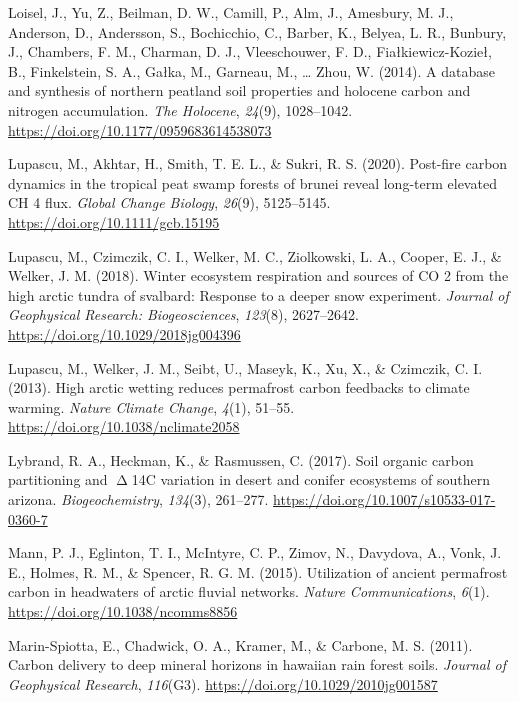 \documentclass[]{article}
\begin{document}
\leavevmode\hypertarget{ref-Loisel_2014}{}%
Loisel, J., Yu, Z., Beilman, D. W., Camill, P., Alm, J., Amesbury, M.
J., Anderson, D., Andersson, S., Bochicchio, C., Barber, K., Belyea, L.
R., Bunbury, J., Chambers, F. M., Charman, D. J., Vleeschouwer, F. D.,
Fiałkiewicz-Kozieł, B., Finkelstein, S. A., Gałka, M., Garneau, M.,
\ldots{} Zhou, W. (2014). A database and synthesis of northern peatland
soil properties and holocene carbon and nitrogen accumulation. \emph{The
Holocene}, \emph{24}(9), 1028--1042.
\url{https://doi.org/10.1177/0959683614538073}

\leavevmode\hypertarget{ref-Lupascu_2020}{}%
Lupascu, M., Akhtar, H., Smith, T. E. L., \& Sukri, R. S. (2020).
Post-fire carbon dynamics in the tropical peat swamp forests of brunei
reveal long-term elevated CH 4 flux. \emph{Global Change Biology},
\emph{26}(9), 5125--5145. \url{https://doi.org/10.1111/gcb.15195}

\leavevmode\hypertarget{ref-Lupascu_2018}{}%
Lupascu, M., Czimczik, C. I., Welker, M. C., Ziolkowski, L. A., Cooper,
E. J., \& Welker, J. M. (2018). Winter ecosystem respiration and sources
of CO 2 from the high arctic tundra of svalbard: Response to a deeper
snow experiment. \emph{Journal of Geophysical Research: Biogeosciences},
\emph{123}(8), 2627--2642. \url{https://doi.org/10.1029/2018jg004396}

\leavevmode\hypertarget{ref-Lupascu_2013}{}%
Lupascu, M., Welker, J. M., Seibt, U., Maseyk, K., Xu, X., \& Czimczik,
C. I. (2013). High arctic wetting reduces permafrost carbon feedbacks to
climate warming. \emph{Nature Climate Change}, \emph{4}(1), 51--55.
\url{https://doi.org/10.1038/nclimate2058}

\leavevmode\hypertarget{ref-Lybrand_2017}{}%
Lybrand, R. A., Heckman, K., \& Rasmussen, C. (2017). Soil organic
carbon partitioning and \(\upDelta\)14C variation in desert and conifer
ecosystems of southern arizona. \emph{Biogeochemistry}, \emph{134}(3),
261--277. \url{https://doi.org/10.1007/s10533-017-0360-7}

\leavevmode\hypertarget{ref-Mann_2015}{}%
Mann, P. J., Eglinton, T. I., McIntyre, C. P., Zimov, N., Davydova, A.,
Vonk, J. E., Holmes, R. M., \& Spencer, R. G. M. (2015). Utilization of
ancient permafrost carbon in headwaters of arctic fluvial networks.
\emph{Nature Communications}, \emph{6}(1).
\url{https://doi.org/10.1038/ncomms8856}

\leavevmode\hypertarget{ref-Marin_Spiotta_2011}{}%
Marin-Spiotta, E., Chadwick, O. A., Kramer, M., \& Carbone, M. S.
(2011). Carbon delivery to deep mineral horizons in hawaiian rain forest
soils. \emph{Journal of Geophysical Research}, \emph{116}(G3).
\url{https://doi.org/10.1029/2010jg001587}
\end{document}
